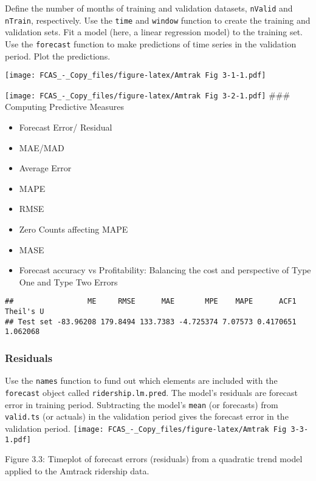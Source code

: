 \documentclass[]{article}
\begin{document}
Define the number of months of training and validation datasets,
\texttt{nValid} and \texttt{nTrain}, respectively. Use the \texttt{time}
and \texttt{window} function to create the training and validation sets.
Fit a model (here, a linear regression model) to the training set. Use
the \texttt{forecast} function to make predictions of time series in the
validation period. Plot the predictions.

\texttt{[image: FCAS\_-\_Copy\_files/figure-latex/Amtrak Fig 3-1-1.pdf]}

\texttt{[image: FCAS\_-\_Copy\_files/figure-latex/Amtrak Fig 3-2-1.pdf]}
\#\#\# Computing Predictive Measures

\begin{itemize}
\item
  Forecast Error/ Residual
\item
  MAE/MAD
\item
  Average Error
\item
  MAPE
\item
  RMSE
\item
  Zero Counts affecting MAPE
\item
  MASE
\item
  Forecast accuracy vs Profitability: Balancing the cost and perspective
  of Type One and Type Two Errors
\end{itemize}

\begin{verbatim}
##                 ME     RMSE      MAE       MPE    MAPE      ACF1 Theil's U
## Test set -83.96208 179.8494 133.7383 -4.725374 7.07573 0.4170651  1.062068
\end{verbatim}

\subsubsection{Residuals}\label{residuals}

Use the \texttt{names} function to fund out which elements are included
with the \texttt{forecast} object called \texttt{ridership.lm.pred}. The
model's residuals are forecast error in training period. Subtracting the
model's \texttt{mean} (or forecasts) from \texttt{valid.ts} (or actuals)
in the validation period gives the forecast error in the validation
period.
\texttt{[image: FCAS\_-\_Copy\_files/figure-latex/Amtrak Fig 3-3-1.pdf]}

Figure 3.3: Timeplot of forecast errors (residuals) from a quadratic
trend model applied to the Amtrack ridership data.
\end{document}

